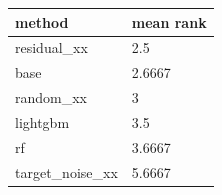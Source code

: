 \begin{tabular}{ll}
\toprule
method & mean rank \\
\midrule
residual\_xx & 2.5 \\
base & 2.6667 \\
random\_xx & 3 \\
lightgbm & 3.5 \\
rf & 3.6667 \\
target\_noise\_xx & 5.6667 \\
\bottomrule
\end{tabular}
